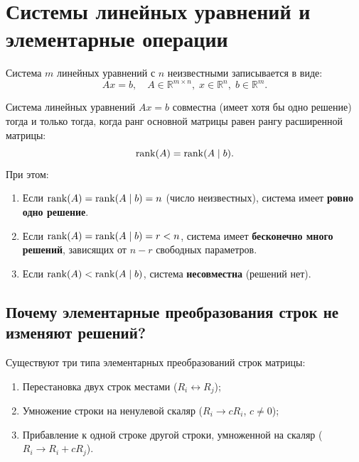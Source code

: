 \section{Системы линейных уравнений и элементарные операции}

Система $m$ линейных уравнений с $n$ неизвестными записывается в виде:
\[ Ax = b, \quad A \in \mathbb{R}^{m \times n}, \; x \in \mathbb{R}^n, \; b \in \mathbb{R}^m. \]
\begin{theorem}
Система линейных уравнений $Ax = b$ совместна (имеет хотя бы одно решение) тогда и только тогда, когда ранг основной
матрицы равен рангу расширенной матрицы:
\[ \operatorname{rank}(A) = \operatorname{rank}(A \mid b). \]
При этом:
\begin{enumerate}
    \item Если $\operatorname{rank}(A) = \operatorname{rank}(A \mid b) = n$ (число неизвестных), система имеет \textbf{ровно одно решение}.
    \item Если $\operatorname{rank}(A) = \operatorname{rank}(A \mid b)=r < n$, система имеет \textbf{бесконечно много решений}, зависящих от $n - r$
    свободных параметров.
    \item Если $\operatorname{rank}(A) < \operatorname{rank}(A \mid b)$, система \textbf{несовместна} (решений нет).
\end{enumerate}
\end{theorem}

\subsection{Почему элементарные преобразования строк не изменяют решений?}
\begin{definition}
Существуют три типа элементарных преобразований строк матрицы:
\begin{enumerate}
    \item Перестановка двух строк местами ($R_i \leftrightarrow R_j$);
    \item Умножение строки на ненулевой скаляр ($R_i \to c R_i$, $c \ne 0$);
    \item Прибавление к одной строке другой строки, умноженной на скаляр ($R_i \to R_i + c R_j$).
\end{enumerate}
\end{definition}

